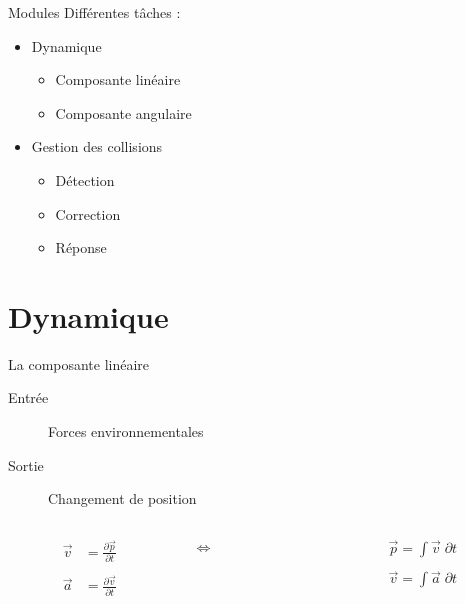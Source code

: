 \documentclass{beamer}
\newcommand{\deriv}{\partial \!}
\begin{document}
\begin{frame}{Modules}
  Différentes tâches :
  \begin{itemize}
  \item Dynamique
    \begin{itemize}
    \item Composante linéaire
    \item Composante angulaire
    \end{itemize}
  \item Gestion des collisions
    \begin{itemize}
    \item Détection
    \item Correction
    \item Réponse
    \end{itemize}
  \end{itemize}
\end{frame}

\section{Dynamique}

\begin{frame}{La composante linéaire}
  \begin{description}
  \item[Entrée] Forces environnementales
  \item[Sortie] Changement de position
  \end{description}

  \vfill

  \begin{columns}
    \begin{column}{3cm}
      \begin{align*}
        \vec{v} &= \frac{\deriv \vec{p}}{\deriv t} \\ \\
        \vec{a} &= \frac{\deriv \vec{v}}{\deriv t}
      \end{align*}
    \end{column}
    \begin{column}{2cm}
      \centering
      $\iff$
    \end{column}
    \begin{column}{3cm}
      \begin{align*}
        \vec{p} = \int \vec{v}\; \deriv t \\ \\
        \vec{v} = \int \vec{a}\; \deriv t
      \end{align*}
    \end{column}
  \end{columns}
\end{frame}
\end{document}
